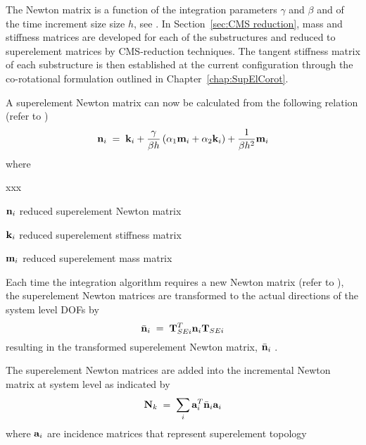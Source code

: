The Newton matrix is a function of the integration parameters $\gamma$ and
$\beta$ and of the time increment size size $h$, see .
In Section~\ref{sec:CMS reduction}, mass and stiffness matrices are developed
for each of the substructures and reduced to superelement matrices by
CMS-reduction techniques.
The tangent stiffness matrix of each substructure is then established at the
current configuration through the co-rotational formulation outlined in
Chapter~\ref{chap:SupElCorot}.

A superelement Newton matrix can now be calculated from the following relation
(refer to )
%
\begin{equation}
{\bf n}_i \;=\; {\bf k}_i
+ \frac{\gamma}{\beta h} \left( \alpha_1 {\bf m}_i + \alpha_2 {\bf k}_i \right)
+ \frac{1}{\beta h^2} {\bf m}_i
\label{eq:340}
\end{equation}
%
where
%
\begin{namelist}{xxx}
\item[${\bf n}_i$] reduced superelement Newton matrix
\item[${\bf k}_i$] reduced superelement stiffness matrix
\item[${\bf m}_i$] reduced superelement mass matrix
\end{namelist}

Each time the integration algorithm requires a new Newton matrix
(refer to ),
the superelement Newton matrices are transformed to the actual directions
of the system level DOFs by
%
\begin{equation}
\bar{\bf n}_i \;=\; {\bf T}_{SEi}^T {\bf n}_i {\bf T}_{SEi}
\label{eq:341}
\end{equation}
%
resulting in the transformed superelement Newton matrix, $\bar{\bf n}_i$
\iftoggle{publicedition}{}{%
(refer to
Sections~\ref{sec:SupElIntForce}--\ref{s:Substituting into system matrices})}.

The superelement Newton matrices are added into the incremental Newton matrix at
system level as indicated by
%
\begin{equation}
{\bf N}_k \;=\; \sum\limits_i {\bf a}_i^T \bar{\bf n}_i {\bf a}_i
\label{eq:342}
\end{equation}
%
where ${\bf a}_i$ are incidence matrices that represent superelement topology
\iftoggle{publicedition}{%
at system level.
}{%
at system level (see also \eqsref{eqSC:512}{eqSC:513}).
} %

